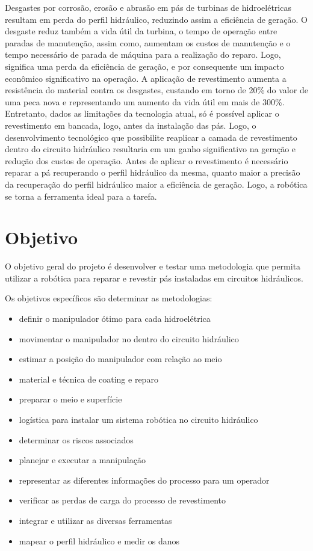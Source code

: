 Desgastes por corrosão, erosão e abrasão em pás de turbinas de hidroelétricas
resultam em perda do perfil hidráulico, reduzindo assim a eficiência de geração.
O desgaste reduz também a vida útil da turbina, o tempo de operação entre
paradas de manutenção, assim como, aumentam os custos de manutenção e o tempo
necessário de parada de máquina para a realização do reparo. Logo, significa uma
perda da eficiência de geração, e por consequente um impacto econômico
significativo na operação.
A aplicação de revestimento aumenta a resistência do material contra os
desgastes, custando em torno de 20\% do valor de uma peca nova e representando
um aumento da vida útil em mais de 300\%. Entretanto, dados as limitações da
tecnologia atual, só é possível aplicar o revestimento em bancada, logo, antes
da instalação das pás. Logo, o desenvolvimento tecnológico que possibilite
reaplicar a camada de revestimento dentro do circuito hidráulico resultaria em
um ganho significativo na geração e redução dos custos de operação.
Antes de aplicar o revestimento é necessário reparar a pá recuperando o perfil
hidráulico da mesma, quanto maior a precisão da recuperação do perfil hidráulico
maior a eficiência de geração. Logo, a robótica se torna a ferramenta ideal para a tarefa.

\section{Objetivo}

O objetivo geral do projeto é desenvolver e testar uma metodologia que permita
utilizar a robótica para reparar e revestir pás instaladas em circuitos hidráulicos.

Os objetivos específicos são determinar as metodologias: 

\begin{itemize}
  \item definir o manipulador ótimo para cada hidroelétrica 
  \item movimentar o manipulador no dentro do circuito hidráulico
  \item estimar a posição do manipulador com relação ao meio
  \item material e técnica de coating e reparo 
  \item preparar o meio e superfície
  \item logística para instalar um sistema robótica no circuito hidráulico
  \item determinar os riscos associados
  \item planejar e executar a manipulação
  \item representar as diferentes informações do processo para um operador
  \item verificar as perdas de carga do processo de revestimento
  \item integrar e utilizar as diversas ferramentas
  \item mapear o perfil hidráulico e medir os danos
\end{itemize}

